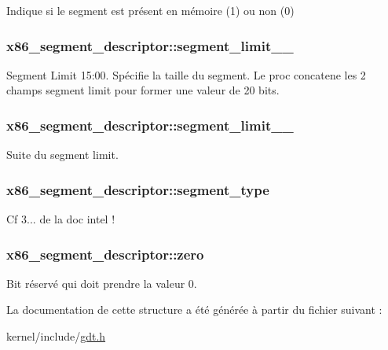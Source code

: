 \-Indique si le segment est présent en mémoire (1) ou non (0) \hypertarget{structx86__segment__descriptor_af9516f6d07c24ddedde31235b05b62c2}{
\subsubsection[{segment\-\_\-limit\-\_\-15\-\_\-0}]{ {\bf x86\-\_\-segment\-\_\-descriptor\-::segment\-\_\-limit\-\_\-\_}}}\label{structx86__segment__descriptor_af9516f6d07c24ddedde31235b05b62c2}
\-Segment \-Limit 15\-:00. \-Spécifie la taille du segment. \-Le proc concatene les 2 champs segment limit pour former une valeur de 20 bits. \hypertarget{structx86__segment__descriptor_a6ab37b8f7730fe67af946725a3dd064a}{
\subsubsection[{segment\-\_\-limit\-\_\-19\-\_\-16}]{ {\bf x86\-\_\-segment\-\_\-descriptor\-::segment\-\_\-limit\-\_\-\_}}}\label{structx86__segment__descriptor_a6ab37b8f7730fe67af946725a3dd064a}
\-Suite du segment limit. \hypertarget{structx86__segment__descriptor_ab3ef0c9fce1e74ee6549bbce5ea6f25f}{
\subsubsection[{segment\-\_\-type}]{ {\bf x86\-\_\-segment\-\_\-descriptor\-::segment\-\_\-type}}}\label{structx86__segment__descriptor_ab3ef0c9fce1e74ee6549bbce5ea6f25f}
\-Cf 3... de la doc intel ! \hypertarget{structx86__segment__descriptor_a4cbd016599f85d6a2060c31d7714dbbd}{
\subsubsection[{zero}]{ {\bf x86\-\_\-segment\-\_\-descriptor\-::zero}}}\label{structx86__segment__descriptor_a4cbd016599f85d6a2060c31d7714dbbd}
\-Bit réservé qui doit prendre la valeur 0. 

\-La documentation de cette structure a été générée à partir du fichier suivant \-:\begin{DoxyCompactItemize}
\item 
kernel/include/\hyperlink{gdt_8h}{gdt.\-h}\end{DoxyCompactItemize}
